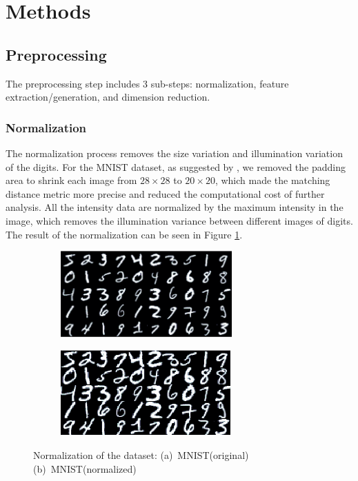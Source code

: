 \documentclass[12pt]{article}
\begin{document}
\section{Methods}
\label{sec:methods}

\subsection{Preprocessing}

The preprocessing step includes 3 sub-steps: normalization, feature extraction/generation, and dimension reduction. 

\subsubsection{Normalization}
The normalization process removes the size variation and illumination variation of the digits. For the MNIST dataset, as suggested by \cite{lecun1998gradient}, we removed the padding area to shrink each image from $28 \times 28$ to $20 \times 20$, which made the matching distance metric more precise and reduced the computational cost of further analysis. All the intensity data are normalized by the maximum intensity in the image, which removes the illumination variance between different images of digits. The result of the normalization can be seen in Figure \ref{fig:norm}.

\begin{figure}[tbp]
	\centering
	\begin{subfigure}{.45\textwidth}
		\includegraphics[height = 1.3in]{MNIST}		
		\caption{ }
	\end{subfigure}
	\begin{subfigure}{.45\textwidth}
		\includegraphics[height = 1.3in]{MNIST_norm}		
		\caption{ }
	\end{subfigure}
	\caption{Normalization of the dataset: (a)~MNIST(original) (b)~MNIST(normalized)}
	\label{fig:norm}
\end{figure}
\end{document}
